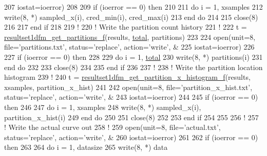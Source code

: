 \begin{DoxyCodeInclude}
207      iostat=ioerror)
208 
209 \textcolor{keywordflow}{if} (ioerror == 0) \textcolor{keywordflow}{then}
210 
211 \textcolor{keywordflow}{do} i = 1, xsamples
212    \textcolor{keyword}{write}(8, *) sampled\_x(i), cred\_min(i), cred\_max(i)
213 \textcolor{keywordflow}{end do}
214 
215 \textcolor{keyword}{close}(8)
216 
217 \textcolor{keywordflow}{end if}
218 
219 \textcolor{comment}{!}
220 \textcolor{comment}{! Write the partition count history}
221 \textcolor{comment}{!}
222 t = \hyperlink{resultset1dfm_8c_a6e099c826ef5e37b367eb70dfe632a5e}{resultset1dfm\_get\_partitions\_f}(results, \hyperlink{rjmcmcf__mpi_8h_a1829e955eab35ef63200105c2de1ad94}{total}, partitions)
223 
224 \textcolor{keyword}{open}(unit=8, file=\textcolor{stringliteral}{'partitions.txt'}, status=\textcolor{stringliteral}{'replace'}, action=\textcolor{stringliteral}{'write'}, &
225      iostat=ioerror)
226 
227 \textcolor{keywordflow}{if} (ioerror == 0) \textcolor{keywordflow}{then}
228 
229 \textcolor{keywordflow}{do} i = 1, \hyperlink{rjmcmcf__mpi_8h_a1829e955eab35ef63200105c2de1ad94}{total}
230    \textcolor{keyword}{write}(8, *) partitions(i)
231 \textcolor{keywordflow}{end do}
232 
233 \textcolor{keyword}{close}(8)
234 
235 \textcolor{keywordflow}{end if}
236 
237 \textcolor{comment}{!}
238 \textcolor{comment}{! Write the partition location histogram}
239 \textcolor{comment}{!}
240 t = \hyperlink{resultset1dfm_8c_a557bf7922150e8adbf18ff40ee10ad53}{resultset1dfm\_get\_partition\_x\_histogram\_f}(results, xsamples, 
      partition\_x\_hist)
241 
242 \textcolor{keyword}{open}(unit=8, file=\textcolor{stringliteral}{'partition\_x\_hist.txt'}, status=\textcolor{stringliteral}{'replace'}, action=\textcolor{stringliteral}{'write'}, &
243      iostat=ioerror)
244 
245 \textcolor{keywordflow}{if} (ioerror == 0) \textcolor{keywordflow}{then}
246 
247 \textcolor{keywordflow}{do} i = 1, xsamples
248    \textcolor{keyword}{write}(8, *) sampled\_x(i), partition\_x\_hist(i)
249 \textcolor{keywordflow}{end do}
250 
251 \textcolor{keyword}{close}(8)
252 
253 \textcolor{keywordflow}{end if}
254 
255 
256 \textcolor{comment}{!}
257 \textcolor{comment}{! Write the actual curve out}
258 \textcolor{comment}{!}
259 \textcolor{keyword}{open}(unit=8, file=\textcolor{stringliteral}{'actual.txt'}, status=\textcolor{stringliteral}{'replace'}, action=\textcolor{stringliteral}{'write'}, &
260      iostat=ioerror)
261 
262 \textcolor{keywordflow}{if} (ioerror == 0) \textcolor{keywordflow}{then}
263 
264 \textcolor{keywordflow}{do} i = 1, datasize
265    \textcolor{keyword}{write}(8, *) data%

\end{DoxyCodeInclude}
